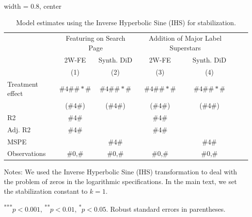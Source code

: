\begin{table}[H]
\caption{Model estimates using the Inverse Hyperbolic Sine (IHS) for stabilization.\label{tab:model_robust_ihs}}
   \centering  
   \begin{adjustbox}{width = 0.8\textwidth, center}
    \begin{threeparttable}[b]
\begin{tabular}{l c c c c c c}
\hline 
 & \multicolumn{2}{c}{Featuring on Search Page} & \multicolumn{2}{c}{Addition of Major Label Superstars} \tabularnewline
 & \multicolumn{1}{c}{2W-FE} & \multicolumn{1}{c}{Synth. DiD} & \multicolumn{1}{c}{2W-FE} & \multicolumn{1}{c}{Synth. DiD} \tabularnewline
 & \multicolumn{1}{c}{(1)} & \multicolumn{1}{c}{(2)} & \multicolumn{1}{c}{(3)} & \multicolumn{1}{c}{(4)}\tabularnewline
\hline 
Treatment effect & $\#4\# \#*\#$ & $\#4\# \#*\#$ & $\#4\# \#*\#$ & $\#4\# \#*\#$ \tabularnewline
 & (\#4\#) & (\#4\#) & (\#4\#) & (\#4\#) \tabularnewline
\hline 
R2 & \multicolumn{1}{c}{\#4\#} & \multicolumn{1}{c}{} & \multicolumn{1}{c}{\#4\#} & \multicolumn{1}{c}{} \tabularnewline
Adj. R2 & \multicolumn{1}{c}{\#4\#} & \multicolumn{1}{c}{} & \multicolumn{1}{c}{\#4\#} & \multicolumn{1}{c}{} \tabularnewline
MSPE & \multicolumn{1}{c}{} & \multicolumn{1}{c}{\#4\#} & \multicolumn{1}{c}{} & \multicolumn{1}{c}{\#4\#}\tabularnewline
Observations & \multicolumn{1}{c}{\#0,\#} & \multicolumn{1}{c}{\#0,\#} & \multicolumn{1}{c}{\#0,\#} & \multicolumn{1}{c}{\#0,\#}\tabularnewline
\hline 
\end{tabular}
\begin{tablenotes}\footnotesize
\vspace{-0.2cm}
    \item Notes: We used the Inverse Hyperbolic Sine (IHS) transformation to deal with the problem of zeros in the logarithmic specifications. In the main text, we set the stabilization constant to $k=1$.

    
  \textsuperscript{***}$p<0.001$, 
  \textsuperscript{**}$p<0.01$, 
  \textsuperscript{*}$p<0.05$. Robust standard errors in parentheses.
\end{tablenotes}
\end{threeparttable}
\end{adjustbox}
\end{table}
